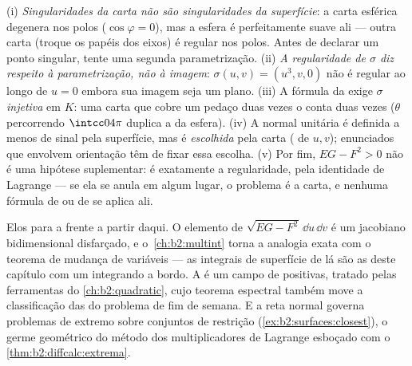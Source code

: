 \begin{remark}
(i) \emph{Singularidades da carta não são singularidades da superfície}:
a carta esférica degenera nos polos
($\cos\varphi = 0$), mas a esfera é perfeitamente suave ali
--- outra carta (troque os papéis dos eixos) é regular
nos polos. Antes de declarar um ponto singular, tente uma segunda
parametrização. (ii) \emph{A regularidade de $\sigma$ diz respeito
à parametrização, não à imagem}: $\sigma(u, v) = (u^3, v,
0)$ não é regular ao longo de $u = 0$ embora sua imagem seja um
plano. (iii) A fórmula da  exige $\sigma$
\emph{injetiva} em $K$: uma carta que cobre um pedaço duas vezes
o conta duas vezes ($\theta$ percorrendo $\intcc0{4\pi}$
duplica a  da esfera). (iv) A normal unitária é definida
a menos de sinal pela superfície, mas é \emph{escolhida} pela carta
( de $u, v$); enunciados que envolvem orientação têm de fixar
essa escolha. (v) Por fim, $EG - F^2 > 0$ não é uma hipótese
suplementar: é exatamente a regularidade, pela identidade de
Lagrange --- se ela se anula em algum lugar, o problema é a
carta, e nenhuma fórmula de  ou de  se aplica ali.
\end{remark}

\begin{remark}
Elos para a frente a partir daqui. O elemento de  $\sqrt{EG -
F^2}\,\dd u\,\dd v$ é um jacobiano bidimensional
disfarçado, e o~\cref{ch:b2:multint} torna a analogia exata
com o teorema de mudança de variáveis --- as integrais de
superfície de lá são as  deste capítulo com um integrando a
bordo. A  é um campo de
 positivas, tratado  pelas ferramentas do
\cref{ch:b2:quadratic}, cujo teorema espectral também move a
classificação das  do problema de fim de semana. E a
reta normal governa problemas de extremo sobre conjuntos de restrição
(\cref{ex:b2:surfaces:closest}), o germe geométrico do
método dos multiplicadores de Lagrange esboçado com o
\cref{thm:b2:diffcalc:extrema}.
\end{remark}

